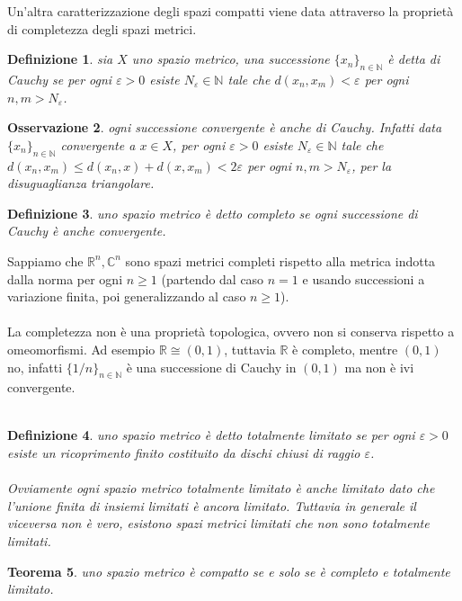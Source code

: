 \documentclass[oneside, 11pt]{amsbook}
\newcommand{\0}{{(0)}}
\newcommand{\3}{{(3)}}
\theoremstyle{colonplain}
\newtheorem{thm}{Teorema}[chapter]
\theoremstyle{colondefinition}
\newtheorem{defn}[thm]{Definizione}
\theoremstyle{colonremark}
\newtheorem{rmk}[thm]{Osservazione}
\numberwithin{equation}{chapter}
\begin{document}
Un'altra caratterizzazione degli spazi compatti viene data attraverso la proprietà di completezza degli spazi metrici.
\begin{defn}
sia $X$ uno spazio metrico, una successione $\{x_n\}_{n \in \mathbb{N}}$ è detta di Cauchy se per ogni $\varepsilon > 0$ esiste $N_\varepsilon \in \mathbb{N}$ tale che $d(x_n, x_m) < \varepsilon$ per ogni $n, m > N_\varepsilon$.
\end{defn}
\begin{rmk}
ogni successione convergente è anche di Cauchy. Infatti data $\{x_n\}_{n \in \mathbb{N}}$ convergente a $x \in X$, per ogni $\varepsilon > 0$ esiste $N_\varepsilon \in \mathbb{N}$ tale che $d(x_n, x_m) \leq d(x_n, x) + d(x, x_m) < 2\varepsilon$ per ogni $n, m > N_\varepsilon$, per la disuguaglianza triangolare.
\end{rmk}
\begin{defn}
uno spazio metrico è detto \textit{completo} se ogni successione di Cauchy è anche convergente.
\end{defn}
Sappiamo che $\mathbb{R}^n, \mathbb{C}^n$ sono spazi metrici completi rispetto alla metrica indotta dalla norma per ogni $n \geq 1$ (partendo dal caso $n = 1$ e usando successioni a variazione finita, poi generalizzando al caso $n \geq 1$). \\ \\
La completezza non è una proprietà topologica, ovvero non si conserva rispetto a omeomorfismi. Ad esempio $\mathbb{R} \cong (0, 1)$, tuttavia $\mathbb{R}$ è completo, mentre $(0, 1)$ no, infatti $\{1/n\}_{n \in \mathbb{N}}$ è una successione di Cauchy in $(0, 1)$ ma non è ivi convergente. \\ \\
\begin{defn} 
uno spazio metrico è detto \textit{totalmente limitato} se per ogni $\varepsilon > 0$ esiste un ricoprimento finito costituito da dischi chiusi di raggio $\varepsilon$. \\ \\
Ovviamente ogni spazio metrico totalmente limitato è anche limitato dato che l'unione finita di insiemi limitati è ancora limitato. Tuttavia in generale il viceversa non è vero, esistono spazi metrici limitati che non sono totalmente limitati.
\end{defn}
\begin{thm}
uno spazio metrico è compatto se e solo se è completo e totalmente limitato.
\end{thm}
\end{document}
